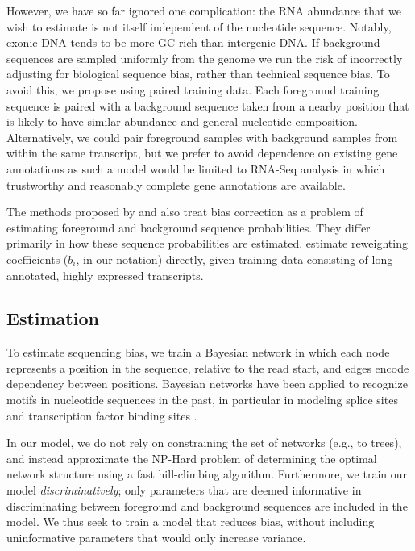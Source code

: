 \documentclass{bioinfo}
\begin{document}
However, we have so far ignored one complication: the RNA abundance that we wish
to estimate is not itself independent of the nucleotide sequence. Notably,
exonic DNA tends to be more GC-rich than intergenic DNA. If background sequences
are sampled uniformly from the genome we run the risk of incorrectly adjusting
for biological sequence bias, rather than technical sequence bias.  To avoid
this, we propose using paired training data. Each foreground training
sequence is paired with a background sequence taken from a nearby position
that is likely to have similar abundance and general nucleotide composition.
Alternatively, we could pair foreground samples with background samples from
within the same transcript, but we prefer to avoid dependence on existing
gene annotations as such a model would be limited to RNA-Seq analysis in which
trustworthy and reasonably complete gene annotations are available.

The methods proposed by \citet{Hansen2010} and \cite{Roberts2011} also treat
bias correction as a problem of estimating foreground and background sequence
probabilities. They differ primarily in how these sequence probabilities are
estimated. \citet{Li2010} estimate reweighting coefficients ($b_i$, in our
notation) directly, given training data consisting of long annotated, highly
expressed transcripts.



\subsection{Estimation}

To estimate sequencing bias, we train a Bayesian network in which each node
represents a position in the sequence, relative to the read start, and edges
encode dependency between positions.  Bayesian networks have been applied to
recognize motifs in nucleotide sequences in the past, in particular in modeling
splice sites \citep{Cai2000, Chen2005} and transcription factor binding sites
\citep{Ben-Gal2005, Grau2006, Pudimat2005}. 

In our model, we do not rely on constraining the set of networks (e.g., to
trees), and instead approximate the NP-Hard problem of determining the optimal
network structure using a fast hill-climbing algorithm. Furthermore, we
train our model \emph{discriminatively}; only parameters that are deemed
informative in discriminating between foreground and background sequences are
included in the model. We thus seek to train a model that reduces bias, without
including uninformative parameters that would only increase variance.
\end{document}
